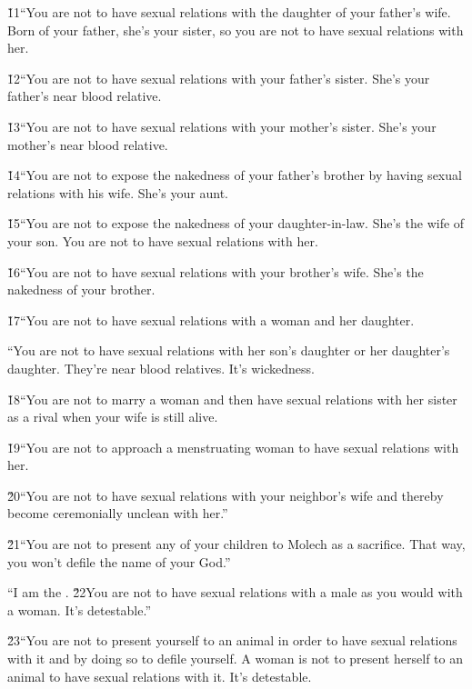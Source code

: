 \v{11}``You are not to have sexual relations with the daughter of your father's wife. Born of your father, she's your sister, so you are not to have sexual relations with her.

\v{12}``You are not to have sexual relations with your father's sister. She's your father's near blood relative.

\v{13}``You are not to have sexual relations with your mother's sister. She's your mother's near blood relative.

\v{14}``You are not to expose the nakedness of your father's brother by having sexual relations with his wife. She's your aunt.

\v{15}``You are not to expose the nakedness of your daughter-in-law. She's the wife of your son. You are not to have sexual relations with her.

\v{16}``You are not to have sexual relations with your brother's wife. She's the nakedness of your brother.

\v{17}``You are not to have sexual relations with a woman and her daughter.

``You are not to have sexual relations with her son's daughter or her daughter's daughter. They're near blood relatives. It's wickedness.

\v{18}``You are not to marry a woman and then have sexual relations with her sister as a rival when your wife is still alive.

\v{19}``You are not to approach a menstruating woman to have sexual relations with her.

\v{20}``You are not to have sexual relations with your neighbor's wife and thereby become ceremonially unclean with her.''

\v{21}``You are not to present any of your children to Molech as a sacrifice. That way, you won't defile the name of your God.''

``I am the . \v{22}You are not to have sexual relations with a male as you would with a woman. It's detestable.''

\v{23}``You are not to present yourself to an animal in order to have sexual relations with it and by doing so to defile yourself. A woman is not to present herself to an animal to have sexual relations with it. It's detestable.

